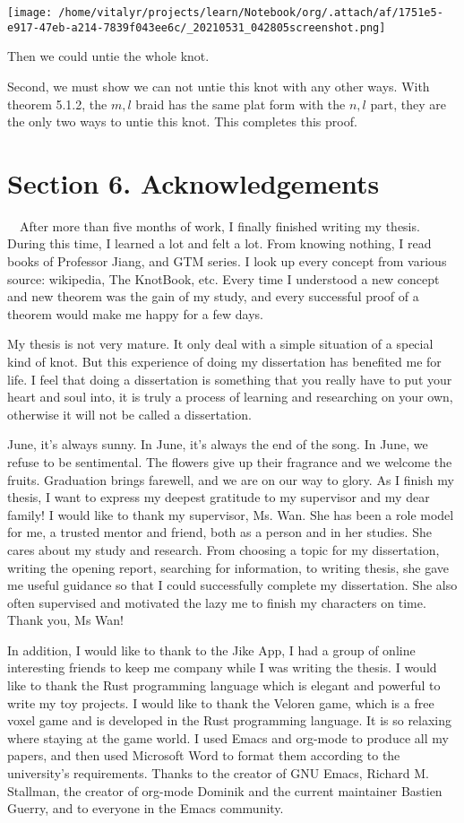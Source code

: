\documentclass[a4paper]{article}
\begin{document}
\begin{center}
\texttt{[image: /home/vitalyr/projects/learn/Notebook/org/.attach/af/1751e5-e917-47eb-a214-7839f043ee6c/\_20210531\_042805screenshot.png]}
\end{center}
Then we could untie the whole knot.

Second, we must show we can not untie this knot with any other ways.
With theorem 5.1.2, the \(m , l\) braid has the same plat form with the \(n, l\) part, they are the only two ways to untie this knot. This completes this proof.

\section{Section 6. Acknowledgements}
\label{sec:orgaef9ae0}
　After more than five months of  work, I finally finished writing my thesis. During this time, I learned a lot and felt a lot. From knowing nothing, I read books of Professor Jiang, and GTM series. I look up every concept from various source: wikipedia, The KnotBook, etc. Every time I understood a new concept and new theorem was the gain of my study, and every successful proof of a theorem would make me happy for a few days.

My thesis is not very mature. It only deal with a simple situation of a special kind of knot. But this experience of doing my dissertation has benefited me for life. I feel that doing a dissertation is something that you really have to put your heart and soul into, it is truly a process of learning and researching on your own, otherwise it will not be called a dissertation.

June, it's always sunny. In June, it's always the end of the song. In June, we refuse to be sentimental. The flowers give up their fragrance and we welcome the fruits. Graduation brings farewell, and we are on our way to glory. As I finish my thesis, I want to express my deepest gratitude to my supervisor and my dear family! I would like to thank my supervisor, Ms. Wan. She has been a role model for me, a trusted mentor and friend, both as a person and in her studies. She cares about my study and research. From choosing a topic for my dissertation, writing the opening report, searching for information, to writing thesis, she gave me  useful guidance so that I could successfully complete my dissertation. She also often supervised and motivated the lazy me to finish my characters on time. Thank you, Ms Wan!

In addition, I would like to thank to the Jike App, I had a group of online interesting friends to keep me company while I was writing the thesis. I would like to thank the Rust programming language which is elegant and powerful to write my toy projects. I would like to thank the Veloren game, which is a free voxel game and is developed in the Rust programming language. It is so relaxing where staying at the game world. I used Emacs and org-mode to produce all my papers, and then used Microsoft Word to format them according to the university's requirements. Thanks to the creator of GNU Emacs, Richard M. Stallman, the creator of org-mode Dominik and the current maintainer Bastien Guerry, and to everyone in the Emacs community.
\end{document}
